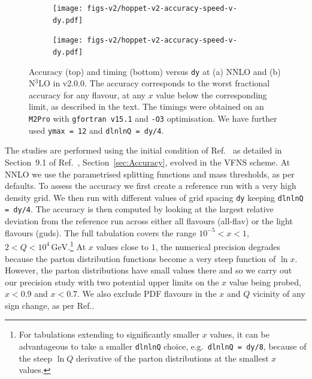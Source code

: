 \begin{figure}[htbp]
    \centering
    \begin{subfigure}{0.49\textwidth}
        \centering
        \texttt{[image: figs-v2/hoppet-v2-accuracy-speed-v-dy.pdf]}
        \caption{}
        \label{fig:main-sub1}
    \end{subfigure}
    \hfill
    \begin{subfigure}{0.49\textwidth}
        \centering
        \texttt{[image: figs-v2/hoppet-v2-accuracy-speed-v-dy.pdf]}
        \caption{}
        \label{fig:main-sub2}
    \end{subfigure}
    \caption{Accuracy (top) and timing (bottom) versus \texttt{dy} at
      (a) NNLO and (b) N$^3$LO in \hoppet{} v2.0.0.
      The accuracy corresponds to the worst fractional accuracy for any flavour,
      at any $x$ value below the corresponding limit, as described in
      the text.
      The timings were
      obtained on an \texttt{M2Pro} with \texttt{gfortran v15.1} and
      \texttt{-O3} optimisation. We have further used \texttt{ymax = 12} and
      \texttt{dlnlnQ = dy/4}.
    }
    \label{fig:main}
\end{figure}

The studies are performed using the initial condition of
Ref.~\cite{Dittmar:2005ed} as detailed in
%
\ifreleasenote
Section~9.1 of Ref.~\cite{Salam:2008qg},
\else
Section~\ref{sec:Accuracy},
\fi
%
evolved in the VFNS scheme.
%
At NNLO we use the parametrised splitting
functions and mass thresholds, as per \hoppet defaults.
%
To
assess the accuracy we first create a reference run with a very high
density grid. We then run \hoppet{} with different values of grid
spacing \texttt{dy} keeping \texttt{dlnlnQ = dy/4}.
%
The accuracy is then computed by looking at the largest relative
deviation from the reference run across either all flavours (all-flav)
or the light flavours (guds).
%
The full tabulation covers the range $10^{-5} < x < 1$,
$2 < Q < 10^4\, \text{GeV}$.\footnote{For tabulations extending to
  significantly smaller $x$ values, it can be advantageous to take a
  smaller \texttt{dlnlnQ} choice, e.g.\ \texttt{dlnlnQ = dy/8},
  because of the steep $\ln Q$ derivative of the parton
  distributions at the smallest $x$ values.}
%
At $x$ values close to $1$, the numerical precision degrades because the
parton distribution functions become a very steep function of $\ln
x$.
%
However, the parton distributions have small values there and so we
carry out our precision study with two potential upper limits on the
$x$ value being probed, $x < 0.9$ and $x < 0.7$.
%
We also exclude PDF flavours in the $x$ and $Q$ vicinity of any sign
change, as per Ref.\cite{Salam:2008qg}.


